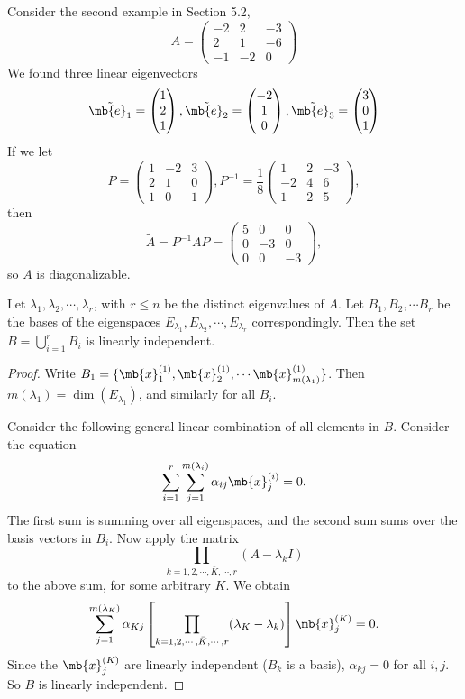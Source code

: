 \documentclass[a4paper]{article}
\begin{document}
Consider the second example in Section 5.2,
\[
A = \begin{pmatrix}
  -2 & 2 & -3\\
  2 & 1 & -6\\
  -1 & -2 & 0
\end{pmatrix}
\]
We found three linear eigenvectors
\[
\tilde{\mb{e}_1} = 
\begin{pmatrix}
  1\\2\\1
\end{pmatrix}, \tilde{\mb{e}_2} = 
\begin{pmatrix}
  -2\\1\\0
\end{pmatrix}, \tilde{\mb{e}_3} = 
\begin{pmatrix}
  3\\0\\1
\end{pmatrix}
\]
If we let 
\[
P = 
\begin{pmatrix}
  1 & -2 & 3\\
  2 & 1 & 0\\
  1 & 0 & 1
\end{pmatrix}, P^{-1} = \frac{1}{8}
\begin{pmatrix}
  1 & 2 & -3\\
  -2 & 4 & 6\\
  1 & 2 & 5
\end{pmatrix},
\]
then 
\[
\tilde{A} = P^{-1}AP = 
\begin{pmatrix}
  5 & 0 & 0\\
  0 & -3 & 0\\
  0 & 0 & -3
\end{pmatrix},
\]
so $A$ is diagonalizable.

\begin{thm}
  Let $\lambda_1, \lambda_2, \cdots, \lambda_r$, with $r \leq n$ be the distinct eigenvalues of $A$. Let $B_1, B_2, \cdots B_r$ be the bases of the eigenspaces $E_{\lambda_1}, E_{\lambda_2}, \cdots, E_{\lambda_r}$ correspondingly. Then the set $\displaystyle B = \bigcup_{i= 1}^r B_i$ is linearly independent. 
\end{thm}

\begin{proof}
  Write $B_1 = \{\mb{x}_1^{(1)}, \mb{x}_2^{(1)}, \cdots \mb{x}_{m(\lambda_1)}^{(1)}\}$. Then $m(\lambda_1) = \dim (E_{\lambda_1})$, and similarly for all $B_i$.

Consider the following general linear combination of all elements in $B$. Consider the equation
\[
\sum_{i = 1}^r\sum_{j = 1}^{m(\lambda_i)} \alpha_{ij} \mb{x}_j^{(i)} = 0.
\]
The first sum is summing over all eigenspaces, and the second sum sums over the basis vectors in $B_i$. Now apply the matrix
\[
\prod_{k = 1, 2, \cdots, \bar{K}, \cdots, r} (A - \lambda_kI)
\]
to the above sum, for some arbitrary $K$. We obtain
\[
\sum_{j = 1}^{m(\lambda_K)}\alpha_{Kj}\left[\prod_{k = 1, 2, \cdots, \bar{K}, \cdots, r}(\lambda_K - \lambda_k)\right]\mb{x}_j^{(K)} = 0.
\]
Since the $\mb{x}^{(K)}_j$ are linearly independent ($B_k$ is a basis), $\alpha_{kj} = 0$ for all $i, j$. So $B$ is linearly independent.
\end{proof}
\end{document}
